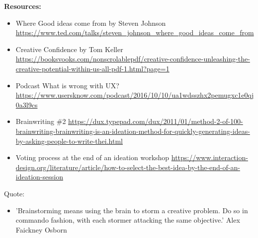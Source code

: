 \textbf{Resources:}

\begin{itemize}
\item Where Good ideas come from by Steven Johnson \url{https://www.ted.com/talks/steven_johnson_where_good_ideas_come_from}
\item Creative Confidence by Tom Keller \url{https://booksvooks.com/nonscrolablepdf/creative-confidence-unleashing-the-creative-potential-within-us-all-pdf-1.html?page=1}
\item Podcast What is wrong with UX? \url{https://www.usersknow.com/podcast/2016/10/10/ua1wdsszhx2pemugxc1e0qj0a3l9cs}
\item Brainwriting \#2 \url{https://dux.typepad.com/dux/2011/01/method-2-of-100-brainwriting-brainwriting-is-an-ideation-method-for-quickly-generating-ideas-by-asking-people-to-write-thei.html}
\item Voting process at the end of an ideation workshop \url{https://www.interaction-design.org/literature/article/how-to-select-the-best-idea-by-the-end-of-an-ideation-session}
\end{itemize}

Quote:

\begin{itemize}
\item 'Brainstorming means using the brain to storm a creative problem. Do so in commando fashion, with each stormer attacking the same objective.' Alex Faickney Osborn
\end{itemize}

